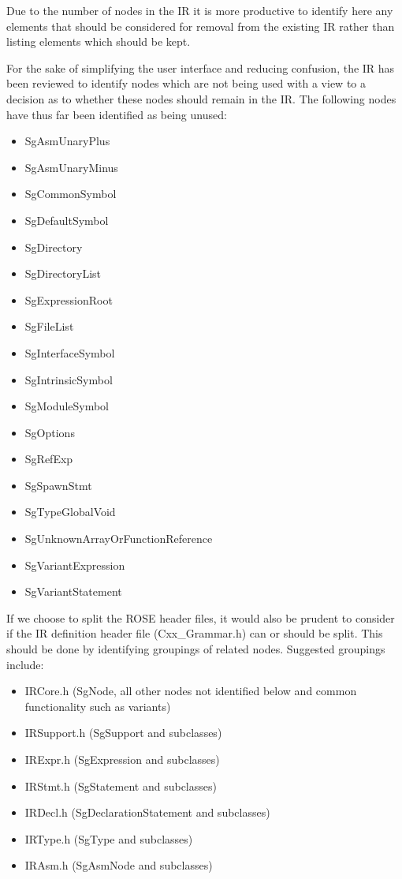 Due to the number of nodes in the IR it is more productive to identify
here any elements that should be considered for removal from the
existing IR rather than listing elements which should be kept.

For the sake of simplifying the user interface and reducing confusion,
the IR has been reviewed to identify nodes which are not being used
with a view to a decision as to whether these nodes should remain
in the IR.  The following nodes have thus far been identified as
being unused:
\begin{itemize}
\item SgAsmUnaryPlus
\item SgAsmUnaryMinus
\item SgCommonSymbol
\item SgDefaultSymbol
\item SgDirectory
\item SgDirectoryList
\item SgExpressionRoot
\item SgFileList
\item SgInterfaceSymbol
\item SgIntrinsicSymbol
\item SgModuleSymbol
\item SgOptions
\item SgRefExp
\item SgSpawnStmt
\item SgTypeGlobalVoid
\item SgUnknownArrayOrFunctionReference
\item SgVariantExpression
\item SgVariantStatement
\end{itemize}

If we choose to split the ROSE header files, it would also be prudent
to consider if the IR definition header file (Cxx\_Grammar.h) can
or should be split.  This should be done by identifying groupings of
related nodes.  Suggested groupings include:
\begin{itemize}
\item IRCore.h (SgNode, all other nodes not identified below and common functionality such as variants)
\item IRSupport.h (SgSupport and subclasses)
\item IRExpr.h (SgExpression and subclasses)
\item IRStmt.h (SgStatement and subclasses)
\item IRDecl.h (SgDeclarationStatement and subclasses)
\item IRType.h (SgType and subclasses)
\item IRAsm.h (SgAsmNode and subclasses)
\end{itemize}

